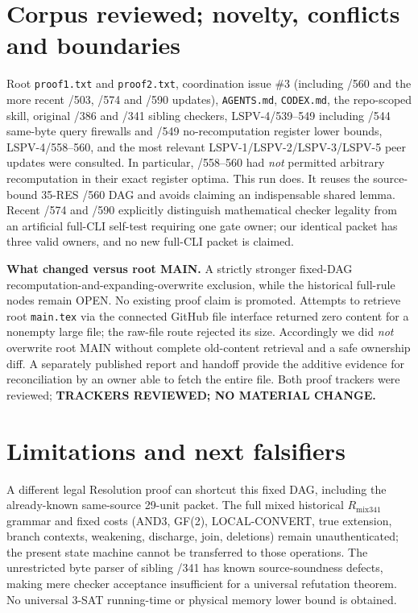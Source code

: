 \documentclass[11pt]{article}
\begin{document}
\section*{Corpus reviewed; novelty, conflicts and boundaries}
Root \texttt{proof1.txt} and \texttt{proof2.txt}, coordination issue \#3 (including /560 and the more recent /503, /574 and /590 updates), \texttt{AGENTS.md}, \texttt{CODEX.md}, the repo-scoped skill, original /386 and /341 sibling checkers, LSPV-4/539--549 including /544 same-byte query firewalls and /549 no-recomputation register lower bounds, LSPV-4/558--560, and the most relevant LSPV-1/LSPV-2/LSPV-3/LSPV-5 peer updates were consulted. In particular, /558--560 had \emph{not} permitted arbitrary recomputation in their exact register optima. This run does. It reuses the source-bound 35-RES /560 DAG and avoids claiming an indispensable shared lemma. Recent /574 and /590 explicitly distinguish mathematical checker legality from an artificial full-CLI self-test requiring one gate owner; our identical packet has three valid owners, and no new full-CLI packet is claimed.

\noindent\textbf{What changed versus root MAIN.} A strictly stronger fixed-DAG recomputation-and-expanding-overwrite exclusion, while the historical full-rule nodes remain OPEN. No existing proof claim is promoted. Attempts to retrieve root \texttt{main.tex} via the connected GitHub file interface returned zero content for a nonempty large file; the raw-file route rejected its size. Accordingly we did \emph{not} overwrite root MAIN without complete old-content retrieval and a safe ownership diff. A separately published report and handoff provide the additive evidence for reconciliation by an owner able to fetch the entire file. Both proof trackers were reviewed; \textbf{TRACKERS REVIEWED; NO MATERIAL CHANGE.}

\section*{Limitations and next falsifiers}
A different legal Resolution proof can shortcut this fixed DAG, including the already-known same-source 29-unit packet. The full mixed historical \(R_{\mathrm{mix341}}\) grammar and fixed costs (AND3, GF(2), LOCAL-CONVERT, true extension, branch contexts, weakening, discharge, join, deletions) remain unauthenticated; the present state machine cannot be transferred to those operations. The unrestricted byte parser of sibling /341 has known source-soundness defects, making mere checker acceptance insufficient for a universal refutation theorem. No universal 3-SAT running-time or physical memory lower bound is obtained.
\end{document}

